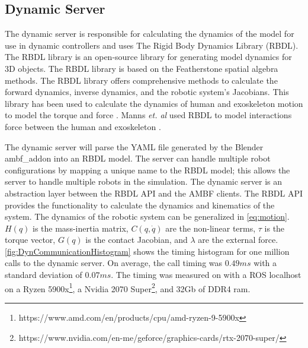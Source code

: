  



 
 
 
 
 \subsection{Dynamic Server}
 The dynamic server is responsible for calculating the dynamics of the model for use in dynamic controllers and uses The Rigid Body Dynamics Library (RBDL)\cite{Felis2016}. The RBDL library is an open-source library for generating model dynamics for 3D objects. The RBDL library is based on the Featherstone spatial algebra methods. The RBDL library offers comprehensive methods to calculate the forward dynamics, inverse dynamics, and the robotic system's Jacobians. This library has been used to calculate the dynamics of human and exoskeleton motion to model the torque and force \cite{millard2017predicting} \cite{harant2017parameter}. Manns \textit{et. al} used RBDL to model interactions force between the human and exoskeleton \cite{manns2017motion}. 
 
 The dynamic server will parse the YAML file generated by the Blender ambf\_addon into an RBDL model. The server can handle multiple robot configurations by mapping a unique name to the RBDL model; this allows the server to handle multiple robots in the simulation. 
 The dynamic server is an abstraction layer between the RBDL API and the AMBF clients. The RBDL API provides the functionality to calculate the dynamics and kinematics of the system. The dynamics of the robotic system can be generalized in  \autoref{eq:motion}. $H(q)$ is the mass-inertia matrix, $C(q,\Dot{q})$ are the non-linear terms, $\tau$ is the torque vector,  $G(q)$ is the contact Jacobian, and $\lambda$ are the external force. \autoref{fig:DynCommunicationHistogram} shows the timing histogram for one million calls to the dynamic server. On average, the call timing was $0.49ms$ with a standard deviation of $0.07ms$.  The timing was measured on with a ROS localhost on a Ryzen 5900x\footnote{https://www.amd.com/en/products/cpu/amd-ryzen-9-5900x}, a Nvidia 2070 Super\footnote{https://www.nvidia.com/en-me/geforce/graphics-cards/rtx-2070-super/}, and 32Gb of DDR4 ram.  


